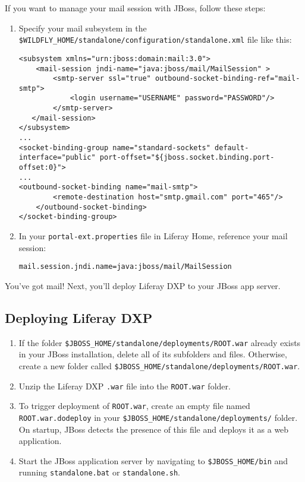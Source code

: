 If you want to manage your mail session with JBoss, follow these steps:

\begin{enumerate}
\def\labelenumi{\arabic{enumi}.}
\item
  Specify your mail subsystem in the
  \texttt{\$WILDFLY\_HOME/standalone/configuration/standalone.xml} file
  like this:

\begin{verbatim}
<subsystem xmlns="urn:jboss:domain:mail:3.0">
    <mail-session jndi-name="java:jboss/mail/MailSession" >
        <smtp-server ssl="true" outbound-socket-binding-ref="mail-smtp">
            <login username="USERNAME" password="PASSWORD"/>
        </smtp-server>
   </mail-session>
</subsystem>
...
<socket-binding-group name="standard-sockets" default-interface="public" port-offset="${jboss.socket.binding.port-offset:0}">
...
<outbound-socket-binding name="mail-smtp">
        <remote-destination host="smtp.gmail.com" port="465"/>
    </outbound-socket-binding>
</socket-binding-group>
\end{verbatim}
\item
  In your \texttt{portal-ext.properties} file in Liferay Home, reference
  your mail session:

\begin{verbatim}
mail.session.jndi.name=java:jboss/mail/MailSession
\end{verbatim}
\end{enumerate}

You've got mail! Next, you'll deploy Liferay DXP to your JBoss app
server.

\subsection{Deploying Liferay DXP}\label{deploying-liferay-dxp-2}

\begin{enumerate}
\def\labelenumi{\arabic{enumi}.}
\item
  If the folder \texttt{\$JBOSS\_HOME/standalone/deployments/ROOT.war}
  already exists in your JBoss installation, delete all of its
  subfolders and files. Otherwise, create a new folder called
  \texttt{\$JBOSS\_HOME/standalone/deployments/ROOT.war}.
\item
  Unzip the Liferay DXP \texttt{.war} file into the \texttt{ROOT.war}
  folder.
\item
  To trigger deployment of \texttt{ROOT.war}, create an empty file named
  \texttt{ROOT.war.dodeploy} in your
  \texttt{\$JBOSS\_HOME/standalone/deployments/} folder. On startup,
  JBoss detects the presence of this file and deploys it as a web
  application.
\item
  Start the JBoss application server by navigating to
  \texttt{\$JBOSS\_HOME/bin} and running \texttt{standalone.bat} or
  \texttt{standalone.sh}.
\end{enumerate}

